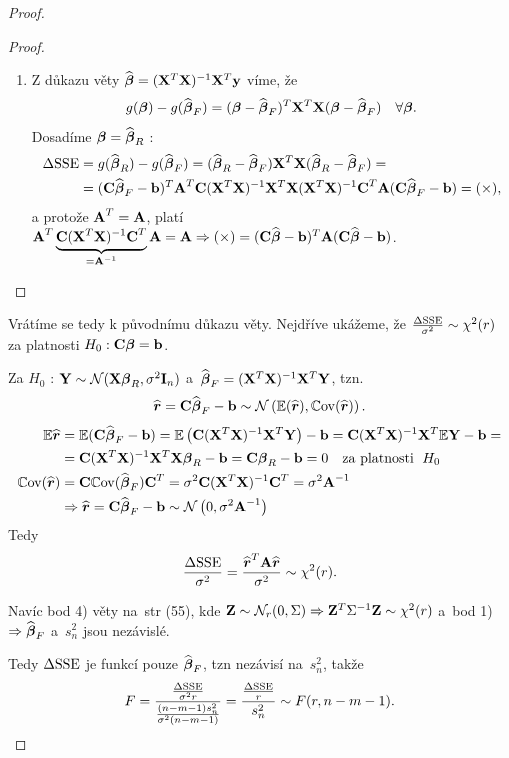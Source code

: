 \begin{proof}
\begin{proof}
\begin{enumerate}
\item
Z důkazu věty $\wbetab = \xtx \X^T \y$ víme, že
 $$
g(\betab) - g(\wbetab_F) = (\betab - \wbetab_F)^T \X^T \X (\betab - \wbetab_F) \quad \forall \betab.
 $$
Dosadíme $\betab = \wbetab_R$ :
\begin{align*}
	\Delta \SSE & = g(\wbetab_R) - g(\wbetab_F) = (\wbetab_R - \wbetab_F) \X^T \X (\wbetab_R - \wbetab_F) = \\
	& = (\Cm \wbetab_F - \bb)^T \Am^T \Cm \xtx \X^T \X \xtx \Cm^T \Am (\Cm \wbetab_F - \bb) = (\times),
\end{align*}
a protože $\Am^T = \Am$, platí $\Am^T\underbrace{\Cm \xtx \Cm^T}_{ = \Am^{-1}} \Am = \Am \Rightarrow (\times) = (\Cm \wbetab - \bb)^T \Am (\Cm \wbetab - \bb)$.

\end{enumerate}
\end{proof}


Vrátíme se tedy k původnímu důkazu věty. Nejdříve ukážeme, že $\frac{\Delta \SSE}{\sigma^2} \sim \chi^2 (r)$ za platnosti $H_0: \Cm\betab = \bb$.

Za $H_0$ : $\Y \sim \NN(\X \betab_R, \sigma^2 \Identita{n})$ a~$\wbetab_F = \xtx \X^T \Y$, tzn.
 $$
\widehat{\boldsymbol{r}} = \Cm \wbetab_F - \bb \sim \NN\left(\E(\widehat{\boldsymbol{r}}), \Cov(\widehat{\boldsymbol{r}}) \right).
 $$
\begin{align*}
\E \widehat{\boldsymbol{r}} & = \E (\Cm \wbetab_F - \bb) = \E \left(\Cm \xtx \X^T \Y \right) - \bb = \Cm \xtx \X^T \E \Y - \bb = \\
& = \Cm \xtx \X^T \X \betab_R - \bb = \Cm \betab_R - \bb = 0 \quad \text{za platnosti \;} H_0 \\
\Cov(\widehat{\boldsymbol{r}}) & = \Cm \Cov(\wbetab_F) \Cm^T = \sigma^2 \Cm \xtx \Cm^T = \sigma^2 \Am^{-1} \\
& \Rightarrow \widehat{\boldsymbol{r}} = \Cm \wbetab_F - \bb \sim \NN \left(0, \sigma^2 \Am^{-1} \right)
\end{align*}
Tedy
 $$
\frac{\Delta \SSE}{\sigma^2} = \frac{\widehat{\boldsymbol{r}}^T \Am \widehat{\boldsymbol{r}}}{\sigma^2} \sim \chi^2(r).
 $$

Navíc bod 4) věty na~str (55), kde $\Zb \sim \NN_r(0, \Sigma) \Rightarrow \Zb^T \Sigma^{-1} \Zb \sim \chi^2(r)$ a~bod 1) $\Rightarrow \wbetab_F$ a~$s_n^2$ jsou nezávislé.

Tedy $\Delta \SSE$ je funkcí pouze $\wbetab_F$, tzn nezávisí na~$s_n^2$, takže
 $$
F = \frac{\frac{\Delta \SSE}{\sigma^2 r}}{\frac{(n-m-1)s_n^2}{\sigma^2(n-m-1)}} = \frac{\frac{\Delta \SSE}{r}}{s_n^2} \sim F(r, n-m-1).
 $$
\end{proof}

